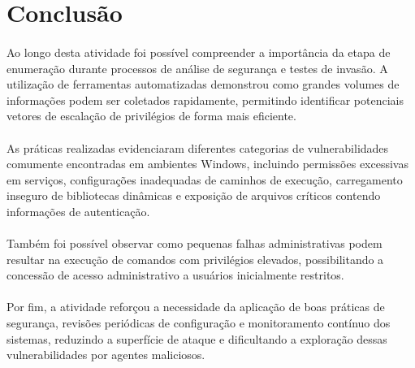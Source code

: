 \section{Conclusão}

\paragraph{}
Ao longo desta atividade foi possível compreender a importância da etapa de
enumeração durante processos de análise de segurança e testes de invasão. A
utilização de ferramentas automatizadas demonstrou como grandes volumes de
informações podem ser coletados rapidamente, permitindo identificar potenciais
vetores de escalação de privilégios de forma mais eficiente.

\paragraph{}
As práticas realizadas evidenciaram diferentes categorias de vulnerabilidades
comumente encontradas em ambientes Windows, incluindo permissões excessivas em
serviços, configurações inadequadas de caminhos de execução, carregamento
inseguro de bibliotecas dinâmicas e exposição de arquivos críticos contendo
informações de autenticação.

\paragraph{}
Também foi possível observar como pequenas falhas administrativas podem
resultar na execução de comandos com privilégios elevados, possibilitando a
concessão de acesso administrativo a usuários inicialmente restritos.

\paragraph{}
Por fim, a atividade reforçou a necessidade da aplicação de boas práticas de
segurança, revisões periódicas de configuração e monitoramento contínuo dos
sistemas, reduzindo a superfície de ataque e dificultando a exploração dessas
vulnerabilidades por agentes maliciosos.
